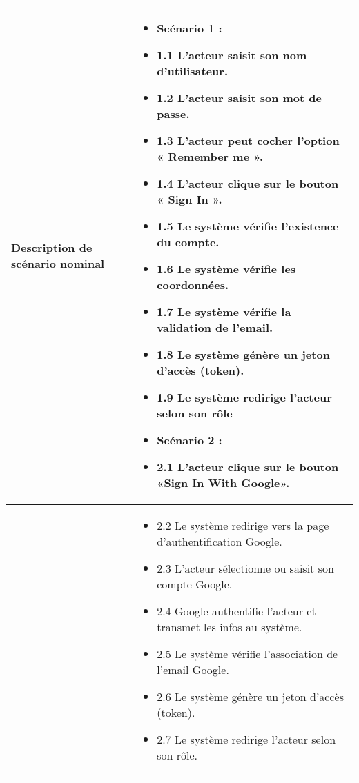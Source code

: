 \begin{longtable}{|>{\arraybackslash}p{4.2cm}|>{\arraybackslash}p{12.5cm}|}
\textbf{Description de scénario nominal} &
\begin{itemize}[label=]
  \item \textbf{Scénario 1 :}
    \item 1.1 L'acteur saisit son nom d'utilisateur.
    \item 1.2 L'acteur saisit son mot de passe.
    \item 1.3 L'acteur peut cocher l'option « Remember me ».
    \item 1.4 L'acteur clique sur le bouton « Sign In ».
    \item 1.5 Le système vérifie l'existence du compte.
    \item 1.6 Le système vérifie les coordonnées.
    \item 1.7 Le système vérifie la validation de l'email.
    \item 1.8 Le système génère un jeton d'accès (token).
    \item 1.9 Le système redirige l'acteur selon son rôle
  \item \textbf{Scénario 2 :}
        \item 2.1 L'acteur clique sur le bouton «Sign In With Google».

\end{itemize} \\
\hline



\textbf{} &
\begin{itemize}
    \item 2.2 Le système redirige vers la page d'authentification Google.
    \item 2.3 L'acteur sélectionne ou saisit son compte Google.
    \item 2.4 Google authentifie l'acteur et transmet les infos au système.
    \item 2.5 Le système vérifie l'association de l'email Google.
    \item 2.6 Le système génère un jeton d'accès (token).
    \item 2.7 Le système redirige l'acteur selon son rôle.
\end{itemize} \\
\hline






\end{longtable}
